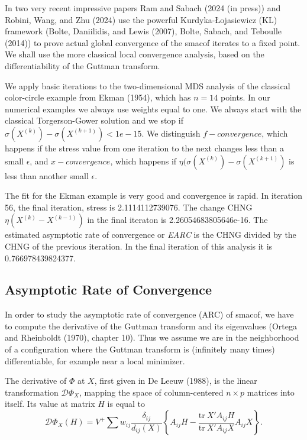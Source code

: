 \documentclass[
  12pt,
]{article}
\begin{document}
In two very recent impressive papers Ram and Sabach (2024 (in press)) and Robini, Wang, and Zhu (2024) use the powerful Kurdyka-Łojasiewicz (KL) framework (Bolte, Daniilidis, and Lewis (2007), Bolte, Sabach, and Teboulle (2014)) to prove actual global convergence of the smacof iterates to a fixed point. We shall use the more classical local convergence analysis, based on the differentiability of the Guttman transform.

We apply basic iterations to the two-dimensional MDS analysis of the classical color-circle example from Ekman (1954), which has \(n=14\) points.
In our numerical examples we always use weights equal to one. We always start with the classical Torgerson-Gower solution and we stop if
\(\sigma(X^{(k)})-\sigma(X^{(k+1)})<1e-15\). We distinguish \(f-convergence\), which
happens if the stress value from one iteration to the next changes less than
a small \(\epsilon\), and \(x-convergence\), which happens if \(\eta(\sigma(X^{(k)})-\sigma(X^{(k+1)})\) is less than another small \(\epsilon\).

The fit for the Ekman example is very good and convergence is rapid.
In iteration 56, the final iteration, stress is 2.1114112739076. The change CHNG \(\eta(X^{(k)}-X^{(k-1)})\) in the final iteraton is 2.26054683805646e-16. The estimated asymptotic rate of convergence or \emph{EARC} is
the CHNG divided by the CHNG of the
previous iteration. In the final iteration of this analysis it is 0.766978439824377.

\subsection{Asymptotic Rate of Convergence}\label{asymptotic-rate-of-convergence}

In order to study the asymptotic rate of convergence (ARC) of smacof, we have to
compute the derivative of the Guttman transform and its eigenvalues (Ortega and Rheinboldt (1970), chapter 10). Thus we assume we are in the neighborhood of a configuration where the Guttman transform is (infinitely many times) differentiable, for example near a local minimizer.

The derivative of \(\Phi\) at \(X\), first given in De Leeuw (1988), is
the linear transformation \(\mathcal{D}\Phi_X\), mapping the space of column-centered
\(n\times p\) matrices into itself. Its value at matrix \(H\) is equal to
\begin{equation}
\mathcal{D}\Phi_X(H)=V^+\sum w_{ij}\frac{\delta_{ij}}{d_{ij}(X)}\left\{A_{ij}H-\frac{\text{tr}\ X'A_{ij}H}{ \text{tr}\ X'A_{ij}X}A_{ij}X\right\}.
\label{eq:jacobian}
\end{equation}
\end{document}

